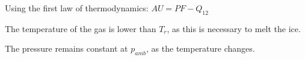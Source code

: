 Using the first law of thermodynamics: \( AU = PF - Q_{12} \)  

The temperature of the gas is lower than \( T_r \), as this is necessary to melt the ice.  

The pressure remains constant at \( p_{amb} \), as the temperature changes.